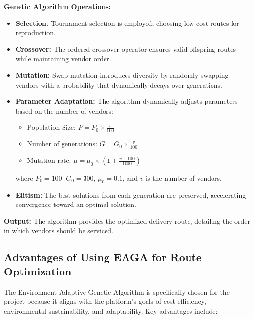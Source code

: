 \textbf{Genetic Algorithm Operations:}
\begin{itemize}
    \item \textbf{Selection:} Tournament selection is employed, choosing low-cost routes for reproduction.
    \item \textbf{Crossover:} The ordered crossover operator ensures valid offspring routes while maintaining vendor order.
    \item \textbf{Mutation:} Swap mutation introduces diversity by randomly swapping vendors with a probability that dynamically decays over generations.
    \item \textbf{Parameter Adaptation:} The algorithm dynamically adjusts parameters based on the number of vendors:
          \begin{itemize}
              \item Population Size: $P = P_0 \times \frac{v}{100}$
              \item Number of generations: $G = G_0 \times \frac{v}{100}$
              \item Mutation rate: $\mu = \mu_0 \times \left(1 + \frac{v - 100}{1000}\right)$
          \end{itemize}
          where $P_0=100$, $G_0=300$, $\mu_0=0.1$, and $v$ is the number of vendors.
    \item \textbf{Elitism:} The best solutions from each generation are preserved, accelerating convergence toward an optimal solution.
\end{itemize}

\textbf{Output:}
The algorithm provides the optimized delivery route, detailing the order in which vendors should be serviced.

\subsection{Advantages of Using EAGA for Route Optimization}

The Environment Adaptive Genetic Algorithm is specifically chosen for the project because it aligns with the platform's goals of cost efficiency, environmental sustainability, and adaptability. Key advantages include:

